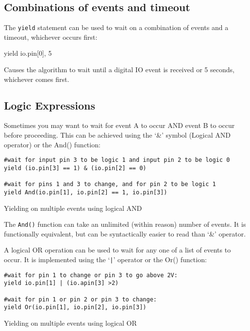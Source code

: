 \documentclass[a4paper, 12pt]{article}
\begin{document}
\subsection{Combinations of events and timeout}
The \texttt{yield} statement can be used to wait on a combination of events and
a timeout, whichever occurs first:

\begin{verbatimtab}
yield io.pin[0], 5
\end{verbatimtab}

Causes the algorithm to wait until a digital IO event is received or 5 seconds,
whichever comes first.


\subsection{Logic Expressions}
Sometimes you may want to wait for event A to occur AND event B to occur before proceeding. This can be achieved using the `\&' symbol (Logical AND operator) or the And() function:
\begin{python}
\begin{verbatim}
#wait for input pin 3 to be logic 1 and input pin 2 to be logic 0
yield (io.pin[3] == 1) & (io.pin[2] == 0)

#wait for pins 1 and 3 to change, and for pin 2 to be logic 1
yield And(io.pin[1], io.pin[2] == 1, io.pin[3]) 
\end{verbatim}
\caption{\label{py:yieldand}Yielding on multiple events using logical AND}
\end{python}

The \texttt{And()} function can take an unlimited (within reason) number of events. It is functionally equivalent, but can be syntactically easier to read than `\&' operator.

\vspace{12pt}

A logical OR operation can be used to wait for any one of a list of events to occur. It is implemented using the `\texttt{|}' operator or the Or() function:
\begin{python}
\begin{verbatim}
#wait for pin 1 to change or pin 3 to go above 2V:
yield io.pin[1] | (io.apin[3] >2)

#wait for pin 1 or pin 2 or pin 3 to change:
yield Or(io.pin[1], io.pin[2], io.pin[3])
\end{verbatim}
\caption{\label{py:yieldor}Yielding on multiple events using logical OR}
\end{python}
\end{document}
